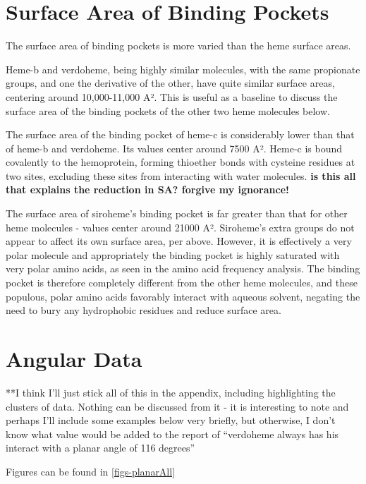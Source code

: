 \documentclass[a4paper, nobind]{templates/ociamthesis}
\begin{document}
\hypertarget{surface-area-of-binding-pockets}{%
\section{Surface Area of Binding Pockets}\label{surface-area-of-binding-pockets}}

The surface area of binding pockets is more varied than the heme surface areas.

Heme-b and verdoheme, being highly similar molecules, with the same propionate groups, and one the derivative of the other, have quite similar surface areas, centering around 10,000-11,000 A². This is useful as a baseline to discuss the surface area of the binding pockets of the other two heme molecules below.

The surface area of the binding pocket of heme-c is considerably lower than that of heme-b and verdoheme. Its values center around 7500 A². Heme-c is bound covalently to the hemoprotein, forming thioether bonds with cysteine residues at two sites, excluding these sites from interacting with water molecules. \textbf{is this all that explains the reduction in SA? forgive my ignorance!}

The surface area of siroheme's binding pocket is far greater than that for other heme molecules - values center around 21000 A². Siroheme's extra groups do not appear to affect its own surface area, per above. However, it is effectively a very polar molecule and appropriately the binding pocket is highly saturated with very polar amino acids, as seen in the amino acid frequency analysis. The binding pocket is therefore completely different from the other heme molecules, and these populous, polar amino acids favorably interact with aqueous solvent, negating the need to bury any hydrophobic residues and reduce surface area.

\hypertarget{angular-data}{%
\section{Angular Data}\label{angular-data}}

**I think I'll just stick all of this in the appendix, including highlighting the clusters of data. Nothing can be discussed from it - it is interesting to note and perhaps I'll include some examples below very briefly, but otherwise, I don't know what value would be added to the report of ``verdoheme always has his interact with a planar angle of 116 degrees''

Figures can be found in \ref{figs-planarAll}
\end{document}
